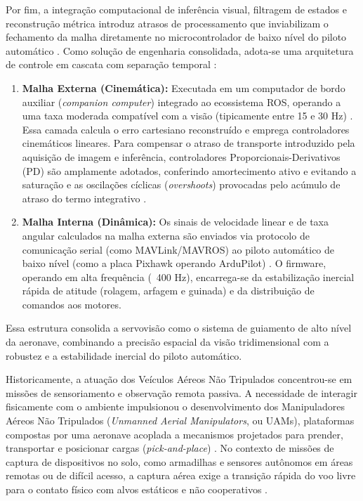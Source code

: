 Por fim, a integração computacional de inferência visual, filtragem de estados e reconstrução métrica introduz atrasos de processamento que inviabilizam o fechamento da malha diretamente no microcontrolador de baixo nível do piloto automático \cite{lopezfranco2017}. Como solução de engenharia consolidada, adota-se uma arquitetura de controle em cascata com separação temporal \cite{shang2016, sciortino2018}:
\begin{enumerate}
    \item \textbf{Malha Externa (Cinemática):} Executada em um computador de bordo auxiliar (\textit{companion computer}) integrado ao ecossistema ROS, operando a uma taxa moderada compatível com a visão (tipicamente entre 15 e 30 Hz) \cite{sciortino2018}. Essa camada calcula o erro cartesiano reconstruído e emprega controladores cinemáticos lineares. Para compensar o atraso de transporte introduzido pela aquisição de imagem e inferência, controladores Proporcionais-Derivativos (PD) são amplamente adotados, conferindo amortecimento ativo e evitando a saturação e as oscilações cíclicas (\textit{overshoots}) provocadas pelo acúmulo de atraso do termo integrativo \cite{shang2016, carvajal2024}.
    \item \textbf{Malha Interna (Dinâmica):} Os sinais de velocidade linear e de taxa angular calculados na malha externa são enviados via protocolo de comunicação serial (como MAVLink/MAVROS) ao piloto automático de baixo nível (como a placa Pixhawk operando ArduPilot) \cite{shang2016, sciortino2018}. O firmware, operando em alta frequência (~400 Hz), encarrega-se da estabilização inercial rápida de atitude (rolagem, arfagem e guinada) e da distribuição de comandos aos motores.
\end{enumerate}
Essa estrutura consolida a servovisão como o sistema de guiamento de alto nível da aeronave, combinando a precisão espacial da visão tridimensional com a robustez e a estabilidade inercial do piloto automático.


Historicamente, a atuação dos Veículos Aéreos Não Tripulados concentrou-se em missões de sensoriamento e observação remota passiva. A necessidade de interagir fisicamente com o ambiente impulsionou o desenvolvimento dos Manipuladores Aéreos Não Tripulados (\textit{Unmanned Aerial Manipulators}, ou UAMs), plataformas compostas por uma aeronave acoplada a mecanismos projetados para prender, transportar e posicionar cargas (\textit{pick-and-place}) \cite{bonyan2018, meng2020, abuzayed2020}. No contexto de missões de captura de dispositivos no solo, como armadilhas e sensores autônomos em áreas remotas ou de difícil acesso, a captura aérea exige a transição rápida do voo livre para o contato físico com alvos estáticos e não cooperativos \cite{bonyan2018, cocuzza2021}.

